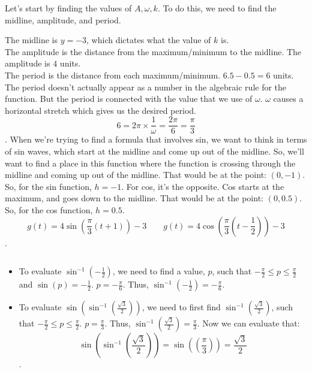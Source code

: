 \begin{solution}
	\label{sol:find_two_algebraic_rules_for_the_function_y_g_t}

	Let's start by finding the values of $A, \omega, k$. To do this, we need to
	find the midline, amplitude, and period.

	The midline is $y = -3$, which dictates what the value of $k$ is. \\
	The amplitude is the distance from the maximum/minimum to the midline. The
	amplitude is $4$ units. \\
	The period is the distance from each maximum/minimum. $6.5 - 0.5 = 6$ units.
	The period doesn't actually appear as a number in the algebraic rule for the
	function. But the period is connected with the value that we use of $\omega$.
	$\omega$ causes a horizontal stretch which gives us the desired period.
	\[
		6 = 2\pi \times \frac{1}{\omega} = \frac{2\pi}{6} = \boxed{\frac{\pi}{3}}
	\].
	When we're trying to find a formula that involves sin, we want to think in
	terms of sin waves, which start at the midline and come up out of the midline.
	So, we'll want to find a place in this function where the function is crossing
	through the midline and coming up out of the midline. That would be at the
	point: $(0, -1)$. So, for the sin function, $h = -1$. For cos, it's the
	opposite. Cos starts at the maximum, and goes down to the midline. That would
	be at the point: $(0, 0.5)$. So, for the cos function, $h = 0.5$.
	\[
		g(t) = 4\sin \left(\frac{\pi}{3} \left(t + 1\right)\right) - 3 \qquad
		g(t) = 4\cos \left(\frac{\pi}{3} \left(t - \frac{1}{2}\right)\right) - 3
	\].
\end{solution}

\begin{solution}
	\label{sol:evaluate_invs_sin}$ $

	\begin{itemize}
		\item To evaluate $\sin^{-1} (-\frac{1}{2})$, we need to find a value, $p$,
		      such that $-\frac{\pi}{2} \le p \le \frac{\pi}{2}$ and $\sin (p) =
			      -\frac{1}{2}$. $p = -\frac{\pi}{6}$. Thus, $\sin^{-1} (-\frac{1}{2}) =
			      -\frac{\pi}{6}$.
		\item To evaluate $\sin (\sin^{-1} (\frac{\sqrt{3}}{2}))$, we need to first
		      find $\sin^{-1} (\frac{\sqrt{3}}{2})$, such that $-\frac{\pi}{2} \le p
			      \le \frac{\pi}{2}$. $p = \frac{\pi}{3}$. Thus, $\sin^{-1}
			      (\frac{\sqrt{3}}{2}) = \frac{\pi}{3}$. Now we can evaluate that:
		      \[
			      \sin \left(\sin^{-1} \left(\frac{\sqrt{3}}{2}\right)\right) = \sin
			      \left(\left(\frac{\pi}{3}\right)\right) = \frac{\sqrt{3}}{2}
		      \].
	\end{itemize}
\end{solution}

